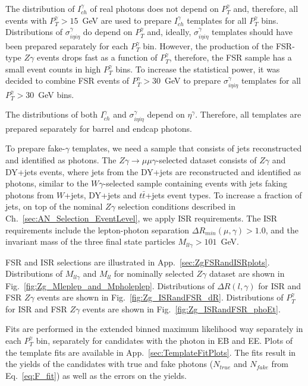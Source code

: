 The distribution of $I_{ch}^{\gamma}$ of real photons does not depend on $P_{T}^{\gamma}$ and, therefore, all events with $P_{T}^{\gamma}>15$~GeV are used to prepare $I_{ch}^{\gamma}$ templates for all $P_T^{\gamma}$ bins. Distributions of $\sigma_{i\eta i\eta}^{\gamma}$ do depend on $P_T^{\gamma}$ and, ideally,  $\sigma_{i\eta i\eta}^{\gamma}$ templates should have been prepared separately for each $P_T^{\gamma}$ bin. However, the production of the FSR-type $Z\gamma$ events drops fast as a function of $P_{T}^{\gamma}$, therefore, the FSR sample has a small event counts in high $P_T^{\gamma}$ bins. To increase the statistical power, it was decided to combine FSR events of $P_T^{\gamma}>30$~GeV to prepare $\sigma_{i\eta i\eta}^{\gamma}$ templates for all $P_T^{\gamma}>30$~GeV bins. 

The distributions of both $I_{ch}^{\gamma}$ and $\sigma_{i\eta i\eta}^{\gamma}$ depend on $\eta^{\gamma}$. Therefore, all templates are prepared separately for barrel and endcap photons.

To prepare fake-$\gamma$ templates, we need a sample that consists of jets reconstructed and identified as photons. The $Z\gamma\rightarrow\mu\mu\gamma$-selected dataset consists of $Z\gamma$ and DY+jets events, where jets from the DY+jets are reconstructed and identified as photons, similar to the $W\gamma$-selected sample containing events with jets faking photons from $W$+jets, DY+jets and $t\bar{t}$+jets event types. To increase a fraction of jets, on top of the nominal $Z\gamma$ selection conditions described in Ch.~\ref{sec:AN_Selection_EventLevel}, we apply ISR requirements. The ISR requirements include the lepton-photon separation $\Delta{R_{min}}(\mu,\gamma)>1.0$, and the invariant mass of the three final state particles $M_{ll\gamma}>101$~GeV. 

FSR and ISR selections are illustrated in App.~\ref{sec:ZgFSRandISRplots}. Distributions of $M_{ll\gamma}$ and $M_{ll}$ for nominally selected $Z\gamma$ dataset are shown in Fig.~\ref{fig:Zg_Mleplep_and_Mpholeplep}. Distributions of $\Delta{R}(l,\gamma)$ for ISR and FSR $Z\gamma$ events are shown in Fig.~\ref{fig:Zg_ISRandFSR_dR}. Distributions of $P_{T}^{\gamma}$ for ISR and FSR $Z\gamma$ events are shown in Fig.~\ref{fig:Zg_ISRandFSR_phoEt}. 

Fits are performed in the extended binned maximum likelihood way separately in each $P_T^{\gamma}$ bin, separately for candidates with the photon in EB and EE. Plots of the template fits are available in App.~\ref{sec:TemplateFitPlots}. The fits result in the yields of the candidates with true and fake photons ($N_{true}$ and $N_{fake}$ from Eq.~\ref{eq:F_fit}) as well as the errors on the yields.

